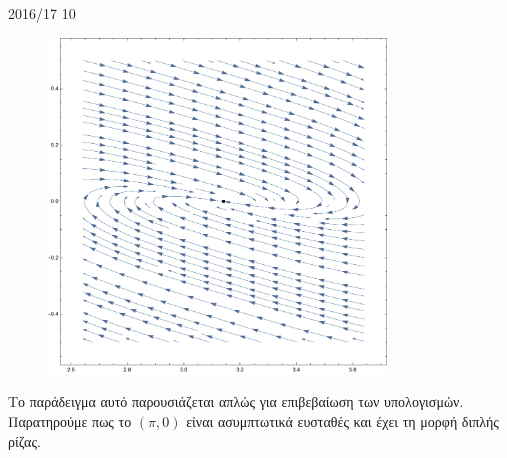\begin{solution}{2016/17 10}
\begin{figure}[h]
        \includegraphics[width=0.8\textwidth]{figures/ex10_b_invPendllComb.pdf}
        \caption{}
        \label{fig:ex10_b_invPendllComb}
    \end{figure}
    Το παράδειγμα αυτό παρουσιάζεται απλώς για επιβεβαίωση των υπολογισμών.
    Παρατηρούμε πως το \( (\pi, 0) \) είναι ασυμπτωτικά ευσταθές και έχει τη
    μορφή διπλής ρίζας.
\end{solution}
